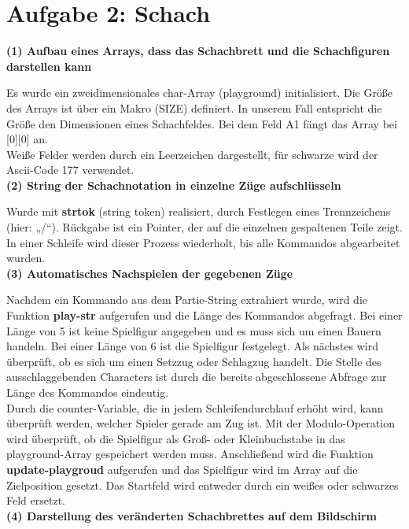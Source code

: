 \chapter*{Aufgabe 2: Schach}

\textbf{(1) Aufbau eines Arrays, dass das Schachbrett und die Schachfiguren darstellen
kann}

Es wurde ein zweidimensionales char-Array (playground) initialisiert. Die Größe des Arrays ist über ein Makro (SIZE) definiert. In unserem Fall entspricht die Größe den Dimensionen eines Schachfeldes.
Bei dem Feld A1 fängt das Array bei [0][0] an. \\
Weiße Felder werden durch ein Leerzeichen dargestellt, für schwarze wird der Ascii-Code 177 verwendet.\\

\textbf{(2) String der Schachnotation in einzelne Züge aufschlüsseln}

Wurde mit \textbf{strtok} (string token) realisiert, durch Festlegen eines Trennzeichens (hier: „/“). Rückgabe ist ein Pointer, der auf die einzelnen gespaltenen Teile zeigt. In einer Schleife wird dieser Prozess wiederholt, bis alle Kommandos abgearbeitet wurden.\\

\textbf{(3) Automatisches Nachspielen der gegebenen Züge}

Nachdem ein Kommando aus dem Partie-String extrahiert wurde, wird die Funktion \textbf{play-str} aufgerufen und die Länge des Kommandos abgefragt. Bei einer Länge von 5 ist keine Spielfigur angegeben und es muss sich um einen Bauern handeln. Bei einer Länge von 6 ist die Spielfigur festgelegt.
Als nächstes wird überprüft, ob es sich um einen Setzzug oder Schlagzug handelt. Die Stelle des ausschlaggebenden Characters ist durch die bereits abgeschlossene Abfrage zur Länge des Kommandos eindeutig. \\
Durch die counter-Variable, die in jedem Schleifendurchlauf erhöht wird, kann überprüft werden, welcher Spieler gerade am Zug ist. Mit der Modulo-Operation wird überprüft, ob die Spielfigur als Groß- oder Kleinbuchstabe in das playground-Array gespeichert werden muss.
Anschließend wird die Funktion \textbf{update-playgroud} aufgerufen und das Spielfigur wird im Array auf die Zielposition gesetzt.
Das Startfeld wird entweder durch ein weißes oder schwarzes Feld ersetzt.\\

\textbf{(4) Darstellung des veränderten Schachbrettes auf dem Bildschirm}

